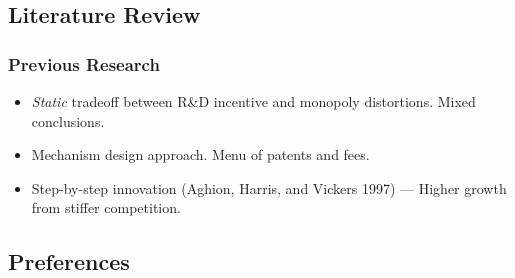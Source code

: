 \documentclass{beamer}
\begin{document}
\subsection{Literature Review}
\label{sub:literature_review}
\begin{frame}[t]\frametitle{Previous Research} 
  \begin{itemize}
    \item<+-> \emph{Static} tradeoff between R\&D incentive and monopoly distortions. Mixed conclusions.
    \item<+-> Mechanism design approach.  Menu of patents and fees.
    \item<+-> Step-by-step innovation (Aghion, Harris, and Vickers 1997) --- Higher growth from stiffer competition.
  \end{itemize}
\end{frame}



\subsection{Preferences}
\label{sub:preferences}
\end{document}
